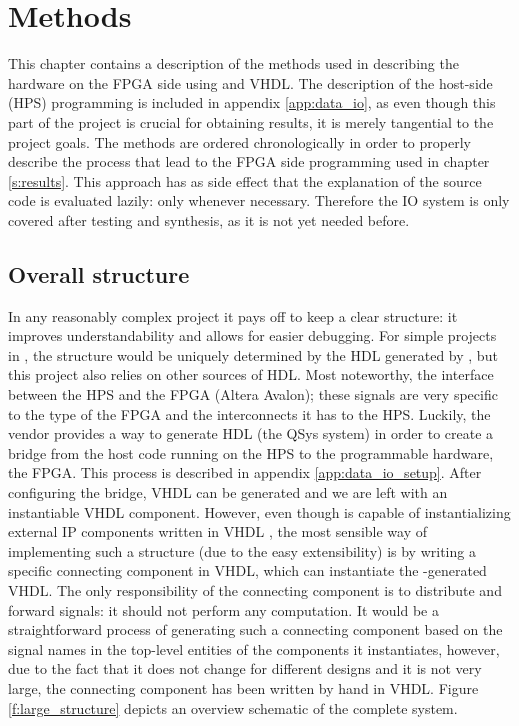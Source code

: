 \chapter{Methods}
This chapter contains a description of the methods used in describing the hardware on the FPGA side using \clash{} and VHDL. The description of the host-side (HPS) programming is included in appendix \ref{app:data_io}, as even though this part of the project is crucial for obtaining results, it is merely tangential to the project goals. The methods are ordered chronologically in order to properly describe the process that lead to the FPGA side programming used in chapter \ref{s:results}. This approach has as side effect that the explanation of the source code is evaluated lazily: only whenever necessary. Therefore the IO system is only covered after testing and synthesis, as it is not yet needed before.

\section{Overall structure}
In any reasonably complex project it pays off to keep a clear structure: it improves understandability and allows for easier debugging. For simple projects in \clash{}, the structure would be uniquely determined by the HDL generated by \clash{}, but this project also relies on other sources of HDL. Most noteworthy, the interface between the HPS and the FPGA (Altera Avalon); these signals are very specific to the type of the FPGA and the interconnects it has to the HPS. Luckily, the vendor provides a way to generate HDL (the QSys system) in order to create a bridge from the host code running on the HPS to the programmable hardware, the FPGA. This process is described in appendix \ref{app:data_io_setup}. After configuring the bridge, VHDL can be generated and we are left with an instantiable VHDL component. However, even though \clash{} is capable of instantializing external IP components written in VHDL \cite{CLaSHBlogTut}, the most sensible way of implementing such a structure (due to the easy extensibility) is by writing a specific connecting component in VHDL, which can instantiate the \clash{}-generated VHDL. The only responsibility of the connecting component is to distribute and forward signals: it should not perform any computation. It would be a straightforward process of generating such a connecting component based on the signal names in the top-level entities of the components it instantiates, however, due to the fact that it does not change for different designs and it is not very large, the connecting component has been written by hand in VHDL. Figure \ref{f:large_structure} depicts an overview schematic of the complete system.


